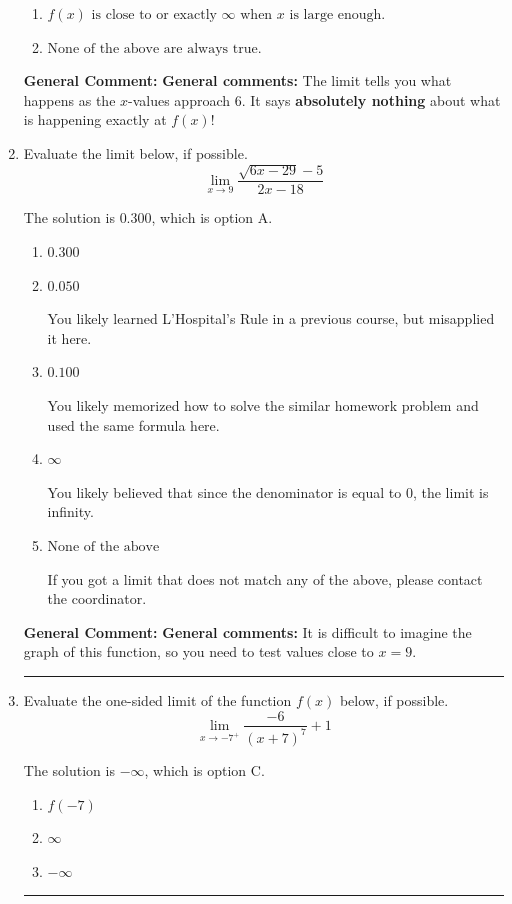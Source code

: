 \documentclass{extbook}[14pt]
\newcommand{\litem}[1]{\item #1

\rule{\textwidth}{0.4pt}}
\begin{document}
\begin{enumerate}
{\begin{enumerate}[label=\Alph*.]
\item \( f(x) \text{ is close to or exactly } \infty \text{ when } x \text{ is large enough}. \)


\item \( \text{None of the above are always true.} \)


\end{enumerate}

\textbf{General Comment:} \textbf{General comments:} The limit tells you what happens as the $x$-values approach $6$. It says \textbf{absolutely nothing} about what is happening exactly at $f(x)$!
}
\litem{
Evaluate the limit below, if possible.
\[ \lim_{x \rightarrow 9} \frac{\sqrt{6x - 29} - 5}{2x - 18} \]

The solution is \( 0.300 \), which is option A.\begin{enumerate}[label=\Alph*.]
\item \( 0.300 \)


\item \( 0.050 \)

You likely learned L'Hospital's Rule in a previous course, but misapplied it here.
\item \( 0.100 \)

You likely memorized how to solve the similar homework problem and used the same formula here.
\item \( \infty \)

You likely believed that since the denominator is equal to 0, the limit is infinity.
\item \( \text{None of the above} \)

If you got a limit that does not match any of the above, please contact the coordinator.
\end{enumerate}

\textbf{General Comment:} \textbf{General comments:} It is difficult to imagine the graph of this function, so you need to test values close to $x = 9$.
}
\litem{
Evaluate the one-sided limit of the function $f(x)$ below, if possible.
\[ \lim_{x \rightarrow -7^+} \frac{-6}{(x+7)^7}+1 \]

The solution is \( -\infty \), which is option C.\begin{enumerate}[label=\Alph*.]
\item \( f(-7) \)


\item \( \infty \)


\item \( -\infty \)



\end{enumerate}}
\end{enumerate}
\end{document}
